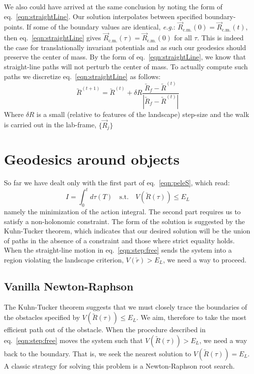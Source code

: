 \documentclass[letter,11pt]{article}
\newcommand{\cvec}[1]{\utilde{#1}}
\newcommand{\svec}[1]{\vec{#1}}
\newcommand{\laeq}[1]{\label{eqn:#1}}
\newcommand{\refeq}[1]{eq.~\ref{eqn:#1}}
\newcommand{\Rcm}{\svec{R}_{\textrm{c.m.}}}
\begin{document}
We also could have arrived at the same conclusion by noting the form of \refeq{straightLine}. Our solution interpolates between specified boundary-points. If some of the boundary values are identical, \emph{e.g.}: $\Rcm(0) = \Rcm(t)$, then \refeq{straightLine} gives $\Rcm(\tau) = \Rcm(0)$ for all $\tau$. This is indeed the case for translationally invariant potentials and as such our geodesics should preserve the center of mass. By the form of \refeq{straightLine}, we know that straight-line paths will not perturb the center of mass. To actually compute such paths we discretize \refeq{straightLine} as follows:
\begin{equation}\laeq{step:free}
  \cvec{R}^{(t+1)} = \cvec{R}^{(t)} + \delta R \frac{\cvec{R}_f - \cvec{R}^{(t)}}{\left| \cvec{R}_f - \cvec{R}^{(t)} \right|}
\end{equation}
Where $\delta R$ is a small (relative to features of the landscape) step-size and the walk is carried out in the lab-frame, $\{\svec{R}_j\}$

\section{Geodesics around objects}
So far we have dealt only with the first part of \refeq{peleS}, which read:
\begin{equation}
  I = \int_{0}^{t}d\tau\left( T \right) \quad \textrm{s.t.} \quad V(\cvec{R}(\tau)) \le E_L
\end{equation}
namely the minimization of the action integral. The second part requires us to satisfy a non-holonomic constraint. The form of the solution is suggested by the Kuhn-Tucker theorem\cite{kuhntucker:1951}, which indicates that our desired solution will be the union of paths in the absence of a constraint and those where strict equality holds. When the straight-line motion in \refeq{step:free} sends the system into a region violating the landscape criterion, $V(\cvec{r}) > E_L$, we need a way to proceed.

\subsection{Vanilla Newton-Raphson}
The Kuhn-Tucker theorem suggests that we must closely trace the boundaries of the obstacles specified by $V(\cvec{R}(\tau)) \le E_L$. We aim, therefore to take the most efficient path out of the obstacle. When the procedure described in \refeq{step:free} moves the system such that $V(\cvec{R}(\tau)) > E_L$, we need a way back to the boundary. That is, we seek the nearest solution to $V(\cvec{R}(\tau)) = E_L$. A classic strategy for solving this problem is a Newton-Raphson root search.
\end{document}
